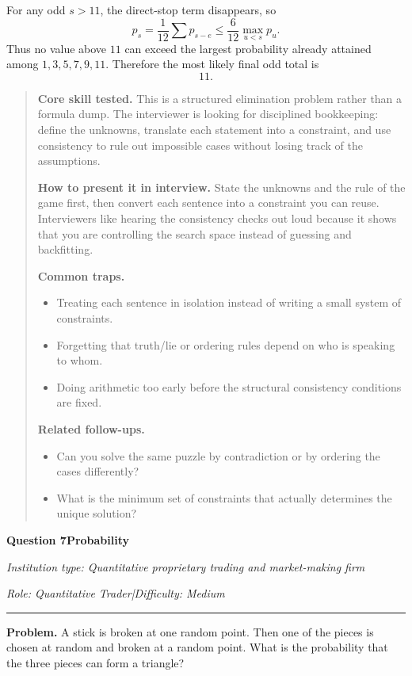 \documentclass[11pt,letterpaper,openany]{book}
\newenvironment{EditorialNote}
  {\begin{quote}\small\setlength{\parskip}{0.25em}}
  {\end{quote}}
\newcommand{\QuestionSpacer}{\vspace{0.4em}}
\newcommand{\InterviewQuestionHeader}[5]{%
  \vspace{1.0em}%
  {\large\bfseries #1\enspace #4\par}%
  {\small\itshape Institution type: #2\par}%
  {\small\itshape Role: #3\enspace |\enspace Difficulty: #5\par}%
  \vspace{0.25em}\hrule\vspace{0.45em}%
}
\begin{document}
For any odd \(s>11\), the direct-stop term disappears, so
\[
p_s=\frac1{12}\sum p_{s-e}\le \frac{6}{12}\max_{u<s}p_u.
\]
Thus no value above \(11\) can exceed the largest probability already attained among \(1,3,5,7,9,11\). Therefore the most likely final odd total is
\[
\boxed{11}.
\]

\begin{EditorialNote}


\textbf{Core skill tested.} This is a structured elimination problem rather than a formula dump. The interviewer is looking for disciplined bookkeeping: define the unknowns, translate each statement into a constraint, and use consistency to rule out impossible cases without losing track of the assumptions.

\textbf{How to present it in interview.} State the unknowns and the rule of the game first, then convert each sentence into a constraint you can reuse. Interviewers like hearing the consistency checks out loud because it shows that you are controlling the search space instead of guessing and backfitting.

\textbf{Common traps.}
\begin{itemize}
\item Treating each sentence in isolation instead of writing a small system of constraints.
\item Forgetting that truth/lie or ordering rules depend on who is speaking to whom.
\item Doing arithmetic too early before the structural consistency conditions are fixed.
\end{itemize}

\textbf{Related follow-ups.}
\begin{itemize}
\item Can you solve the same puzzle by contradiction or by ordering the cases differently?
\item What is the minimum set of constraints that actually determines the unique solution?
\end{itemize}


\end{EditorialNote}
\QuestionSpacer

\InterviewQuestionHeader{Question 7}{Quantitative proprietary trading and market-making firm}{Quantitative Trader}{Probability}{Medium}
\textbf{Problem.} A stick is broken at one random point. Then one of the pieces is chosen at random and broken at a random point. What is the probability that the three pieces can form a triangle?
\end{document}
